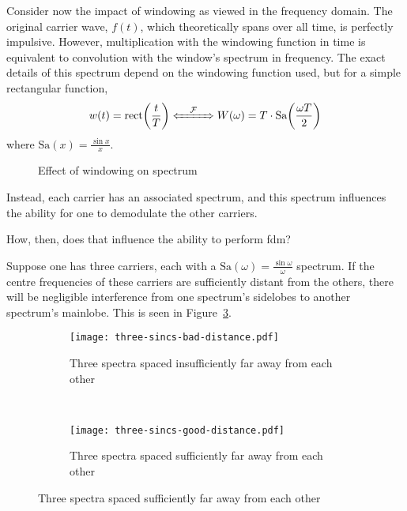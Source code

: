 \documentclass[class=report,11pt,crop=false]{standalone}
\begin{document}
Consider now the impact of windowing as viewed in the frequency domain. The original carrier wave, \(f(t)\), which theoretically spans over all time, is perfectly impulsive. However, multiplication with the windowing function in time is equivalent to convolution with the window's spectrum in frequency. The exact details of this spectrum depend on the windowing function used, but for a simple rectangular function,
\begin{equation}
    w(t) = \textrm{rect}\bigg(\frac{t}{T}\bigg) \xLeftrightarrow{\quad\mathcal{F}\quad} W(\omega) = T \cdot \textrm{Sa}\bigg(\frac{\omega T}{2}\bigg)
\end{equation}
where \(\textrm{Sa}(x)=\frac{\sin{x}}{x}\).

\begin{figure}[htbp]
    \centering
    \captionsetup{type=figure}
    \def\svgwidth{\linewidth}
    { %
        }
    \caption{Effect of windowing on spectrum}
    \label{fig:sampling-sine-freq}
\end{figure}

Instead, each carrier has an associated spectrum, and this spectrum influences the ability for one to demodulate the other carriers.

How, then, does that influence the ability to perform \gls{fdm}?

Suppose one has three carriers, each with a \(\textrm{Sa}(\omega) = \frac{\sin \omega}{\omega}\) spectrum. If the centre frequencies of these carriers are sufficiently distant from the others, there will be negligible interference from one spectrum's sidelobes to another spectrum's mainlobe. This is seen in Figure~\ref{fig:three-sincs-good-distance}.

\begin{figure}[htbp]
    \centering
    \captionsetup{type=figure}
    \begin{subfigure}[t]{0.45\textwidth}
        \centering
        \captionsetup{type=figure}
        \texttt{[image: three-sincs-bad-distance.pdf]}
        \caption{Three spectra spaced insufficiently far away from each other}
        \label{fig:three-sincs-bad-distance}
    \end{subfigure}%
    ~
    \begin{subfigure}[t]{0.545\textwidth}
        \centering
        \captionsetup{type=figure}
        \texttt{[image: three-sincs-good-distance.pdf]}
        \caption{Three spectra spaced sufficiently far away from each other}
        \label{fig:three-sincs-good-distance}
    \end{subfigure}
    \caption{Three spectra spaced sufficiently far away from each other}
    \label{fig:fig:three-sincs-good-and-bad}
  \end{figure}
\end{document}
